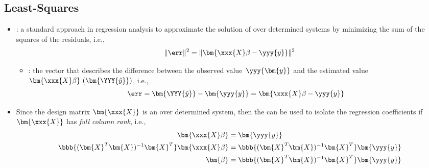 \begin{itemize}
  \subsection{Least-Squares}
  \begin{itemize}
    \item {}: a standard approach in regression analysis to approximate the solution of over determined systems by minimizing the sum of the squares of the residuals, i.e.,
    \[%
    \| \err \|^2 = \| \bm{\xxx{X}\beta - \yyy{y}}\|^2
    \]%
    \begin{itemize}
      \item {}: the vector that describes the difference{} between the observed value~\(\yyy{\bm{y}}\) and the estimated value \(\bm{\xxx{X}\beta}~(\bm{\YYY{\hat{y}}})\), i.e.,
      \[%
      \err = \bm{\YYY{\hat{y}}} - \bm{\yyy{y}} = \bm{\xxx{X}\beta - \yyy{y}}
      \]%
    \end{itemize}
  \item Since the design matrix \(\bm{\xxx{X}}\) is an over determined system, then the  can be used to isolate the regression coefficients if \(\bm{\xxx{X}}\) has \emph{full column rank}, i.e.,
  \begin{align*}
    \bm{\xxx{X}\beta} &= \bm{\yyy{y}} \\
    \bbb{(\bm{X}^T \bm{X})^{-1} \bm{X}^T} \bm{\xxx{X}\beta} &= \bbb{(\bm{X}^T \bm{X})^{-1} \bm{X}^T} \bm{\yyy{y}} \\
    \bm{\beta} &= \bbb{(\bm{X}^T \bm{X})^{-1} \bm{X}^T} \bm{\yyy{y}}
  \end{align*}
  \end{itemize}


\end{itemize}
